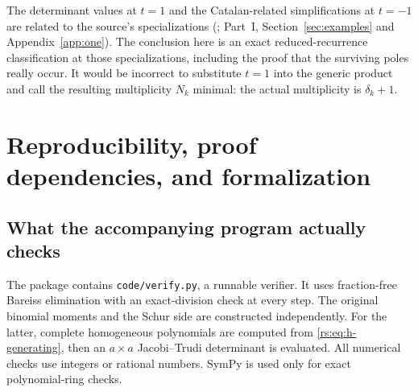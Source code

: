 \documentclass[11pt]{article}
\theoremstyle{definition}
\theoremstyle{remark}
\theoremstyle{definition}
\theoremstyle{plain}
\numberwithin{equation}{section}
\begin{document}
The determinant values at $t=1$ and the Catalan-related simplifications at
$t=-1$ are related to the source's specializations (\cite{Cigler}; Part~I, Section~\ref{sec:examples} and Appendix~\ref{app:one}).
The conclusion here is an exact reduced-recurrence classification at those
specializations, including the proof that the surviving poles really occur.
It would be incorrect to substitute $t=1$ into the generic product and call
the resulting multiplicity $N_k$ minimal: the actual multiplicity is
$\delta_k+1$.

\section{Reproducibility, proof dependencies, and formalization}
\label{rs:sec:audit}

\subsection{What the accompanying program actually checks}
The package contains \texttt{code/verify.py}, a runnable verifier. It uses
fraction-free Bareiss elimination with an exact-division check at every
step. The original binomial moments and the Schur side are constructed
independently. For the latter, complete homogeneous polynomials are
computed from \eqref{rs:eq:h-generating}, then an $a\times a$ Jacobi--Trudi
determinant is evaluated. All numerical checks use integers or rational
numbers. SymPy is used only for exact polynomial-ring checks.
\end{document}
